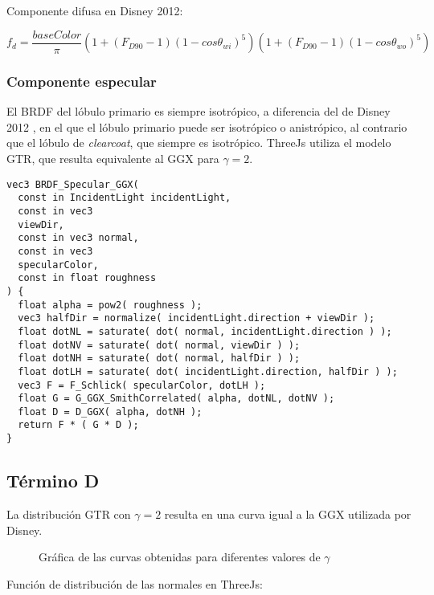   Componente difusa en Disney 2012:

  \begin{equation}
    f_d = \frac{baseColor}{\pi}
    \left(  1 + (F_{D90} - 1)(1 - cos\theta_{wi})^5  \right)
    \left(  1 + (F_{D90} - 1)(1 - cos\theta_{wo})^5  \right)
  \end{equation}
  \singlespacing


  \subsubsection{Componente especular}
  El BRDF del l\'obulo primario es siempre isotr\'opico, a diferencia del de Disney 2012 \autocite{disney12}, en el que
  el l\'obulo primario puede ser isotr\'opico o anistr\'opico, al contrario que el l\'obulo de \textit{clearcoat},
  que siempre es isotr\'opico. ThreeJs utiliza el modelo GTR, que resulta equivalente al GGX \autocite{ggx} para $\gamma = 2$.

  \singlespacing
  \begin{lstlisting}[caption=Clase MeshClothMaterial]
vec3 BRDF_Specular_GGX(
  const in IncidentLight incidentLight,
  const in vec3
  viewDir,
  const in vec3 normal,
  const in vec3
  specularColor,
  const in float roughness
) {
  float alpha = pow2( roughness );
  vec3 halfDir = normalize( incidentLight.direction + viewDir );
  float dotNL = saturate( dot( normal, incidentLight.direction ) );
  float dotNV = saturate( dot( normal, viewDir ) );
  float dotNH = saturate( dot( normal, halfDir ) );
  float dotLH = saturate( dot( incidentLight.direction, halfDir ) );
  vec3 F = F_Schlick( specularColor, dotLH );
  float G = G_GGX_SmithCorrelated( alpha, dotNL, dotNV );
  float D = D_GGX( alpha, dotNH );
  return F * ( G * D );
}
  \end{lstlisting}
  \singlespacing

  \subsection*{T\'ermino D}
  La distribuci\'on GTR con $\gamma = 2$ resulta en una curva igual a la GGX utilizada por Disney.

  \begin{figure}[H]
    \centering
    \caption{Gr\'afica de las curvas obtenidas para diferentes valores de $\gamma$}
    \vspace{0.5cm}
  \end{figure}
  \newpage
  Funci\'on de distribuci\'on de las normales en ThreeJs:\\

